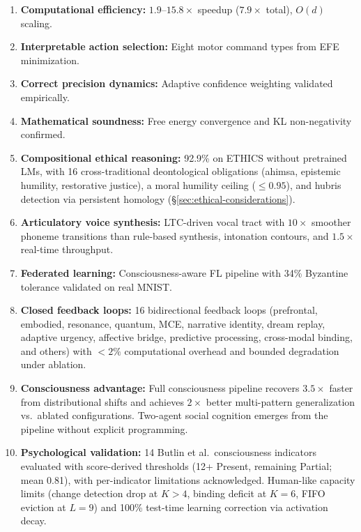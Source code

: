 \documentclass[10pt,letterpaper]{article}
\begin{document}
\begin{enumerate}[nosep]
  \item \textbf{Computational efficiency:} $1.9$--$15.8\times$ speedup ($7.9\times$ total), $O(d)$ scaling.
  \item \textbf{Interpretable action selection:} Eight motor command types from EFE minimization.
  \item \textbf{Correct precision dynamics:} Adaptive confidence weighting validated empirically.
  \item \textbf{Mathematical soundness:} Free energy convergence and KL non-negativity confirmed.
  \item \textbf{Compositional ethical reasoning:} 92.9\% on ETHICS without pretrained LMs, with 16 cross-traditional deontological obligations (ahimsa, epistemic humility, restorative justice), a moral humility ceiling ($\leq 0.95$), and hubris detection via persistent homology (\S\ref{sec:ethical-considerations}).
  \item \textbf{Articulatory voice synthesis:} LTC-driven vocal tract with $10{\times}$ smoother phoneme transitions than rule-based synthesis, intonation contours, and $1.5{\times}$ real-time throughput.
  \item \textbf{Federated learning:} Consciousness-aware FL pipeline with 34\% Byzantine tolerance validated on real MNIST.
  \item \textbf{Closed feedback loops:} 16 bidirectional feedback loops (prefrontal, embodied, resonance, quantum, MCE, narrative identity, dream replay, adaptive urgency, affective bridge, predictive processing, cross-modal binding, and others) with $<2\%$ computational overhead and bounded degradation under ablation.
  \item \textbf{Consciousness advantage:} Full consciousness pipeline recovers $3.5\times$ faster from distributional shifts and achieves $2\times$ better multi-pattern generalization vs.\ ablated configurations. Two-agent social cognition emerges from the pipeline without explicit programming.
  \item \textbf{Psychological validation:} 14 Butlin et al.\ consciousness indicators evaluated with score-derived thresholds (12+ Present, remaining Partial; mean 0.81), with per-indicator limitations acknowledged. Human-like capacity limits (change detection drop at $K{>}4$, binding deficit at $K{=}6$, FIFO eviction at $L{=}9$) and 100\% test-time learning correction via activation decay.
\end{enumerate}
\end{document}
